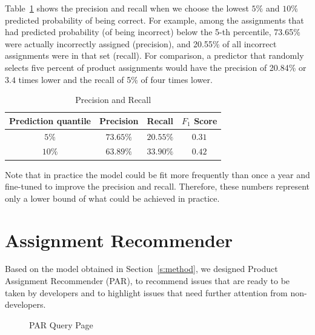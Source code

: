 \documentclass{sig-alternate}
\begin{document}
Table~\ref{tab:pr} shows the precision and recall when we choose
the lowest $5\%$ and $10\%$ predicted probability of being correct.
For example, among the assignments that had predicted
probability (of being incorrect) below the 5-th percentile, 73.65\%
were actually incorrectly assigned (precision),
and 20.55\% of all incorrect assignments were in that set (recall).
For comparison, a predictor that randomly selects five percent of
product assignments would have the precision of 20.84\% or $3.4$
times lower and the recall of 5\% of four times lower.

\begin{table}
\vspace{-.2cm}
\centering
\caption{Precision and Recall}\label{tab:pr}
\begin{tabular}{c|c|c|c}
   \hline
   Prediction quantile & Precision & Recall & $F_1$ Score\\ \hline
   $5\%$ &$73.65\%$ & $20.55\%$ & $0.31$ \\
   $10\%$ &$63.89\%$& $33.90\%$ & $0.42$ \\
   \hline
\end{tabular}
\vspace{-.1cm}
\end{table}

Note that in practice the
model could be fit more frequently than once a year and fine-tuned
to improve the precision and recall. Therefore, these numbers represent
only a lower bound of what could be achieved in practice.

\section{Assignment Recommender}\label{s:paar}
Based on the model obtained in Section~\ref{s:method}, we designed
Product Assignment Recommender (PAR), to recommend issues that are
ready to be taken by developers and to highlight issues that need
further attention from non-developers.

\begin{figure}[ht]
\vspace{0cm}
\centering
\caption{PAR Query Page}\label{fig:query}
\vspace{-.35cm}
\end{figure}
\end{document}
